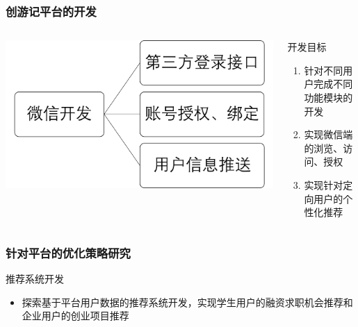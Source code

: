 \documentclass{beamer}
\begin{document}
\begin{frame}
  \frametitle{创游记平台的开发}
  \begin{columns}
    \begin{column}{0.50\textwidth}
      \includegraphics[width=\textwidth]{./img/web_weixin.png}
    \end{column}
    \begin{column}{0.50\textwidth}
      \begin{block}{开发目标}
        \begin{enumerate}
          \item 针对不同用户完成不同功能模块的开发
          \item 实现微信端的浏览、访问、授权
          \item 实现针对定向用户的个性化推荐
        \end{enumerate}
      \end{block}
    \end{column}
  \end{columns}
\end{frame}

\begin{frame}
\frametitle{针对平台的优化策略研究}
  \begin{block}{推荐系统开发}
  	\begin{itemize}
  		\item 探索基于平台用户数据的推荐系统开发，实现学生用户的融资求职机会推荐和企业用户的创业项目推荐
  	\end{itemize}
  \end{block}
\end{frame}
\end{document}
